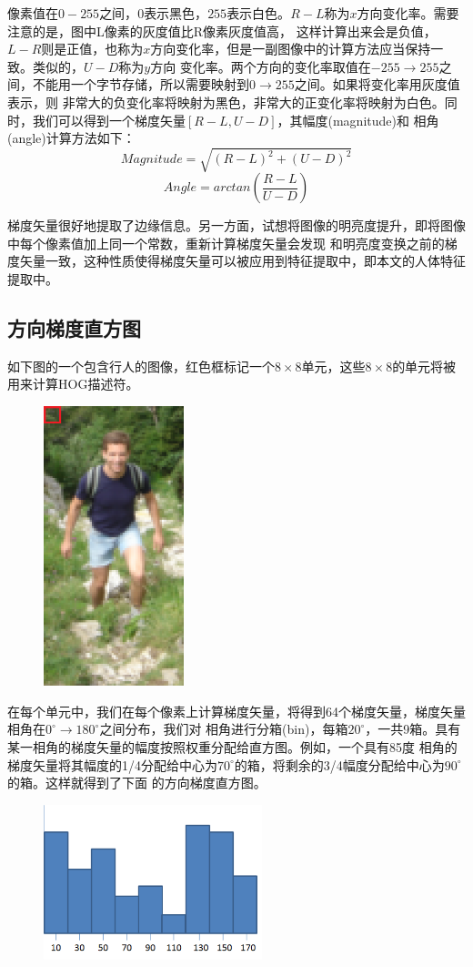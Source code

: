 \documentclass[10pt,technote,onecolumn,twoside]{IEEEtran}
\begin{document}
像素值在$0-255$之间，$0$表示黑色，$255$表示白色。$R-L$称为$x$方向变化率。需要注意的是，图中L像素的灰度值比R像素灰度值高，
这样计算出来会是负值，$L-R$则是正值，也称为$x$方向变化率，但是一副图像中的计算方法应当保持一致。类似的，$U-D$称为$y$方向
变化率。两个方向的变化率取值在$-255\to255$之间，不能用一个字节存储，所以需要映射到$0\to255$之间。如果将变化率用灰度值表示，则
非常大的负变化率将映射为黑色，非常大的正变化率将映射为白色。同时，我们可以得到一个梯度矢量$[R-L,U-D]$，其幅度(magnitude)和
相角(angle)计算方法如下：
\[Magnitude=\sqrt{(R-L)^2+(U-D)^2}\]
\[Angle=arctan\left(\frac{R-L}{U-D}\right)\]

梯度矢量很好地提取了边缘信息。另一方面，试想将图像的明亮度提升，即将图像中每个像素值加上同一个常数，重新计算梯度矢量会发现
和明亮度变换之前的梯度矢量一致，这种性质使得梯度矢量可以被应用到特征提取中，即本文的人体特征提取中。
\newpage
\subsection{方向梯度直方图}
如下图的一个包含行人的图像，红色框标记一个$8\times8$单元，这些$8\times8$的单元将被用来计算HOG描述符。
\begin{figure}[!h]
\centering
\includegraphics[width=1.6in]{hog-1.png}
\end{figure}
在每个单元中，我们在每个像素上计算梯度矢量，将得到64个梯度矢量，梯度矢量相角在$0^\circ\to180^\circ$之间分布，我们对
相角进行分箱(bin)，每箱$20^\circ$，一共9箱。具有某一相角的梯度矢量的幅度按照权重分配给直方图。例如，一个具有85度
相角的梯度矢量将其幅度的1/4分配给中心为$70^\circ$的箱，将剩余的3/4幅度分配给中心为$90^\circ$的箱。这样就得到了下面
的方向梯度直方图。
\begin{figure}[htbp]
\centering
\includegraphics[width=2.5in]{hog-2.png}
\end{figure}
\end{document}
